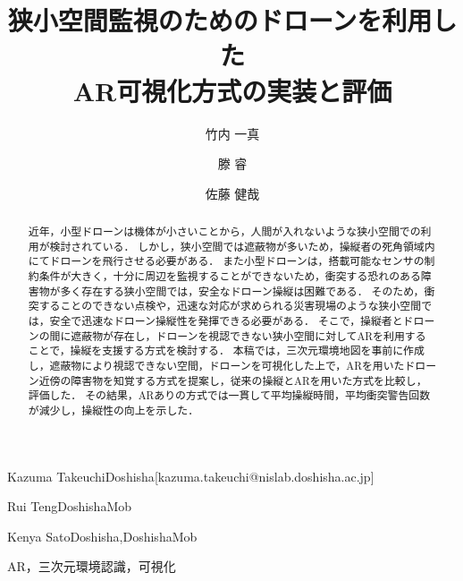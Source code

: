 \documentclass[submit]{ipsj}
\begin{document}
\title{狭小空間監視のためのドローンを利用した\\ AR可視化方式の実装と評価}




\author{竹内 一真}{Kazuma Takeuchi}{Doshisha}[kazuma.takeuchi@nislab.doshisha.ac.jp]
\author{滕 睿}{Rui Teng}{DoshishaMob}
\author{佐藤 健哉}{Kenya Sato}{Doshisha,DoshishaMob}

\begin{abstract}
近年，小型ドローンは機体が小さいことから，人間が入れないような狭小空間での利用が検討されている．
しかし，狭小空間では遮蔽物が多いため，操縦者の死角領域内にてドローンを飛行させる必要がある．
また小型ドローンは，搭載可能なセンサの制約条件が大きく，十分に周辺を監視することができないため，衝突する恐れのある障害物が多く存在する狭小空間では，安全なドローン操縦は困難である．
そのため，衝突することのできない点検や，迅速な対応が求められる災害現場のような狭小空間では，安全で迅速なドローン操縦性を発揮できる必要がある．
そこで，操縦者とドローンの間に遮蔽物が存在し，ドローンを視認できない狭小空間に対してARを利用することで，操縦を支援する方式を検討する．
本稿では，三次元環境地図を事前に作成し，遮蔽物により視認できない空間，ドローンを可視化した上で，ARを用いたドローン近傍の障害物を知覚する方式を提案し，従来の操縦とARを用いた方式を比較し，評価した．
その結果，ARありの方式では一貫して平均操縦時間，平均衝突警告回数が減少し，操縦性の向上を示した．
\end{abstract}

\begin{jkeyword}
AR，三次元環境認識，可視化
\end{jkeyword}
\end{document}
